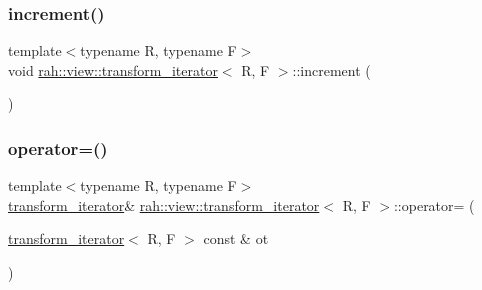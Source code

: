 \subsubsection{\texorpdfstring{increment()}{increment()}\hspace{0.1cm}{\footnotesize\ttfamily [2/2]}}
{\footnotesize\ttfamily template$<$typename R, typename F$>$ \\
void \mbox{\hyperlink{structrah_1_1view_1_1transform__iterator}{rah\+::view\+::transform\+\_\+iterator}}$<$ R, F $>$\+::increment (\begin{DoxyParamCaption}{ }\end{DoxyParamCaption})\hspace{0.3cm}{\ttfamily [inline]}}

\mbox{\label{structrah_1_1view_1_1transform__iterator_a4589b5fff7d8505b8a569c9d1f863929}} 
\subsubsection{\texorpdfstring{operator=()}{operator=()}\hspace{0.1cm}{\footnotesize\ttfamily [1/2]}}
{\footnotesize\ttfamily template$<$typename R, typename F$>$ \\
\mbox{\hyperlink{structrah_1_1view_1_1transform__iterator}{transform\+\_\+iterator}}\& \mbox{\hyperlink{structrah_1_1view_1_1transform__iterator}{rah\+::view\+::transform\+\_\+iterator}}$<$ R, F $>$\+::operator= (\begin{DoxyParamCaption}\item[{\mbox{\hyperlink{structrah_1_1view_1_1transform__iterator}{transform\+\_\+iterator}}$<$ R, F $>$ const \&}]{ot }\end{DoxyParamCaption})\hspace{0.3cm}{\ttfamily [inline]}}

\mbox{\label{structrah_1_1view_1_1transform__iterator_a4589b5fff7d8505b8a569c9d1f863929}} 
